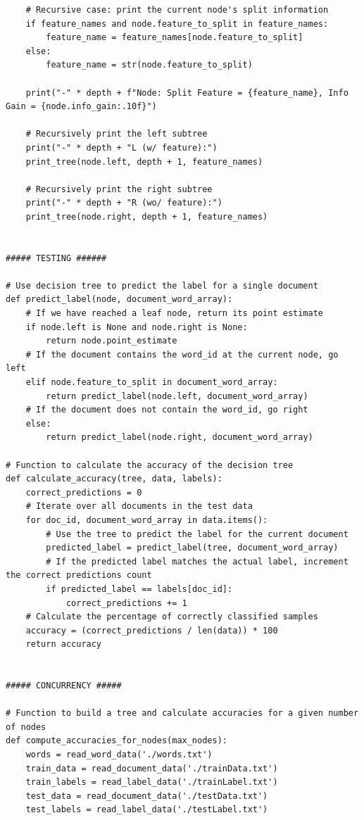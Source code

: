 \documentclass[10pt]{article}
\begin{document}
\begin{enumerate}
\begin{lstlisting}
    # Recursive case: print the current node's split information
    if feature_names and node.feature_to_split in feature_names:
        feature_name = feature_names[node.feature_to_split]
    else:
        feature_name = str(node.feature_to_split)

    print("-" * depth + f"Node: Split Feature = {feature_name}, Info Gain = {node.info_gain:.10f}")

    # Recursively print the left subtree
    print("-" * depth + "L (w/ feature):")
    print_tree(node.left, depth + 1, feature_names)

    # Recursively print the right subtree
    print("-" * depth + "R (wo/ feature):")
    print_tree(node.right, depth + 1, feature_names)
    
    
##### TESTING ######

# Use decision tree to predict the label for a single document
def predict_label(node, document_word_array):
    # If we have reached a leaf node, return its point estimate
    if node.left is None and node.right is None:
        return node.point_estimate
    # If the document contains the word_id at the current node, go left
    elif node.feature_to_split in document_word_array:
        return predict_label(node.left, document_word_array)
    # If the document does not contain the word_id, go right
    else:
        return predict_label(node.right, document_word_array)

# Function to calculate the accuracy of the decision tree
def calculate_accuracy(tree, data, labels):
    correct_predictions = 0
    # Iterate over all documents in the test data
    for doc_id, document_word_array in data.items():
        # Use the tree to predict the label for the current document
        predicted_label = predict_label(tree, document_word_array)
        # If the predicted label matches the actual label, increment the correct predictions count
        if predicted_label == labels[doc_id]:
            correct_predictions += 1
    # Calculate the percentage of correctly classified samples
    accuracy = (correct_predictions / len(data)) * 100
    return accuracy


##### CONCURRENCY #####

# Function to build a tree and calculate accuracies for a given number of nodes
def compute_accuracies_for_nodes(max_nodes):
    words = read_word_data('./words.txt')
    train_data = read_document_data('./trainData.txt')
    train_labels = read_label_data('./trainLabel.txt')
    test_data = read_document_data('./testData.txt')
    test_labels = read_label_data('./testLabel.txt')


\end{lstlisting}
\end{enumerate}
\end{document}

